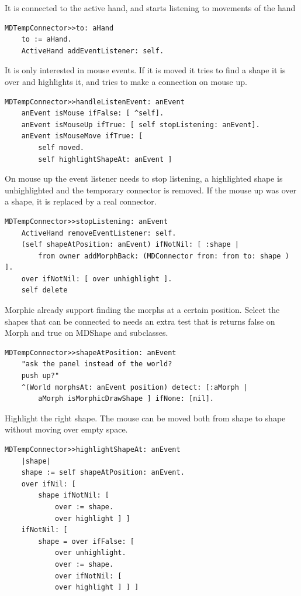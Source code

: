 \documentclass[10pt]{article}   	%
\begin{document}
It is connected to the active hand, and starts listening to
movements of the hand
\begin{verbatim}
MDTempConnector>>to: aHand
    to := aHand.
    ActiveHand addEventListener: self.
\end{verbatim}
It is only interested in mouse events. If it is moved it tries to find
a shape it is over and highlights it, and tries to make a connection 
on mouse up.
\begin{verbatim}
MDTempConnector>>handleListenEvent: anEvent
    anEvent isMouse ifFalse: [ ^self].
    anEvent isMouseUp ifTrue: [ self stopListening: anEvent]. 
    anEvent isMouseMove ifTrue: [ 
        self moved.
        self highlightShapeAt: anEvent ]
\end{verbatim}
On mouse up the event listener needs to stop listening, 
a highlighted shape is unhighlighted and the
temporary connector is removed. If the mouse up was over
a shape, it is replaced by a real connector.
\begin{verbatim}
MDTempConnector>>stopListening: anEvent
    ActiveHand removeEventListener: self.
    (self shapeAtPosition: anEvent) ifNotNil: [ :shape |
        from owner addMorphBack: (MDConnector from: from to: shape ) ].
    over ifNotNil: [ over unhighlight ].
    self delete
\end{verbatim}	
Morphic already support finding the morphs at a certain 
position. Select the shapes that can be connected to needs
an extra test that is returns false on Morph and true on
MDShape and subclasses.
\begin{verbatim}
MDTempConnector>>shapeAtPosition: anEvent
    "ask the panel instead of the world? 
    push up?"
    ^(World morphsAt: anEvent position) detect: [:aMorph |
        aMorph isMorphicDrawShape ] ifNone: [nil].
\end{verbatim}	
Highlight the right shape. The mouse can be moved 
both from shape to shape without moving over empty space.
\begin{verbatim}
MDTempConnector>>highlightShapeAt: anEvent
    |shape|
    shape := self shapeAtPosition: anEvent.
    over ifNil: [ 
        shape ifNotNil: [ 
            over := shape.
            over highlight ] ]
    ifNotNil: [ 
        shape = over ifFalse: [ 
            over unhighlight.
            over := shape.
            over ifNotNil: [  
            over highlight ] ] ]
\end{verbatim}	
\end{document}
